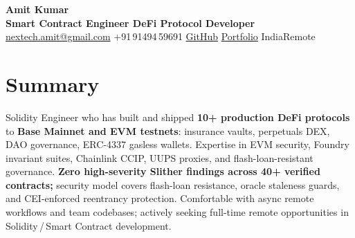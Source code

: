 \documentclass[10pt, a4paper]{article}
\begin{document}
\begin{center}
  {\fontsize{22}{26}\selectfont\bfseries\color{ink} Amit Kumar}\\[3pt]
  {\fontsize{9}{11}\selectfont\bfseries\color{dim}
    Smart Contract Engineer
    \enspace\textbar\enspace
    DeFi Protocol Developer}\\[3.5pt]
  {\fontsize{8.5}{11}\selectfont\color{soft}
    \href{mailto:nextech.amit@gmail.com}{nextech.amit@gmail.com}
    \enspace\textbar\enspace
    +91\,91494\,59691
    \enspace\textbar\enspace
    \href{https://github.com/NexTechArchitect}{GitHub}
    \enspace\textbar\enspace
    \href{https://nex-tech-architect-portfolio.vercel.app}{Portfolio}
    \enspace\textbar\enspace
    India\enspace\textbar\enspace Remote}
\end{center}

\vspace{1pt}

\section{Summary}
{\fontsize{8.8}{13}\selectfont\color{soft}
Solidity Engineer who has built and shipped \textbf{10+ production DeFi protocols} to \textbf{Base Mainnet and EVM testnets}: insurance vaults, perpetuals DEX, DAO governance, ERC-4337 gasless wallets. Expertise in EVM security, Foundry invariant suites, Chainlink CCIP, UUPS proxies, and flash-loan-resistant governance. \textbf{Zero high-severity Slither findings across 40+ verified contracts;} security model covers flash-loan resistance, oracle staleness guards, and CEI-enforced reentrancy protection. Comfortable with async remote workflows and team codebases; actively seeking full-time remote opportunities in Solidity\,/\,Smart Contract development.}

\end{document}
